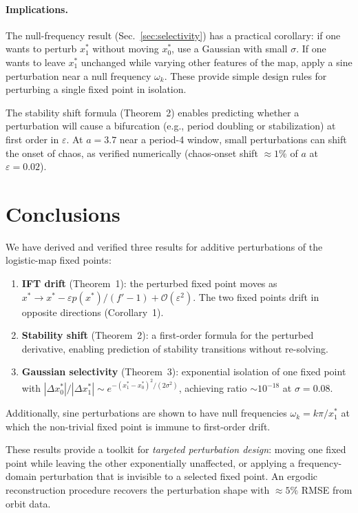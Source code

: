 \documentclass[aps,pre,twocolumn,superscriptaddress,nofootinbib,
               longbibliography,floatfix]{revtex4-2}
\newcommand{\eps}{\varepsilon}
\newcommand{\xsz}{x^*_0}
\newcommand{\xso}{x^*_1}
\newcommand{\bigO}[1]{\mathcal{O}(#1)}
\theoremstyle{plain}
\theoremstyle{remark}
\begin{document}
\paragraph{Implications.}
The null-frequency result (Sec.~\ref{sec:selectivity}) has a
practical corollary: if one wants to perturb $\xso$ without
moving $\xsz$, use a Gaussian with small $\sigma$.
If one wants to leave $\xso$ unchanged while varying other
features of the map, apply a sine perturbation near a null
frequency $\omega_k$.
These provide simple design rules for perturbing a single
fixed point in isolation.

The stability shift formula (Theorem~2) enables predicting
whether a perturbation will cause a bifurcation (e.g., period
doubling or stabilization) at first order in $\eps$.
At $a = 3.7$ near a period-4 window, small perturbations can
shift the onset of chaos, as verified numerically
(chaos-onset shift $\approx 1\%$ of $a$ at $\eps = 0.02$).

\section{Conclusions}
\label{sec:conclusions}

We have derived and verified three results for additive
perturbations of the logistic-map fixed points:
%
\begin{enumerate}
  \item \textbf{IFT drift} (Theorem~1): the perturbed fixed
    point moves as $x^* \to x^* - \eps p(x^*)/(f'-1) + \bigO{\eps^2}$.
    The two fixed points drift in opposite directions
    (Corollary~1).
  \item \textbf{Stability shift} (Theorem~2): a first-order
    formula for the perturbed derivative, enabling prediction
    of stability transitions without re-solving.
  \item \textbf{Gaussian selectivity} (Theorem~3): exponential
    isolation of one fixed point with $|\Delta x^*_0|/|\Delta x^*_1|
    \sim e^{-(\xso - \xsz)^2/(2\sigma^2)}$,
    achieving ratio $\sim 10^{-18}$ at $\sigma = 0.08$.
\end{enumerate}
%
Additionally, sine perturbations are shown to have null
frequencies $\omega_k = k\pi/\xso$ at which the non-trivial
fixed point is immune to first-order drift.

These results provide a toolkit for \emph{targeted perturbation
design}: moving one fixed point while leaving the other
exponentially unaffected, or applying a frequency-domain
perturbation that is invisible to a selected fixed point.
An ergodic reconstruction procedure recovers the perturbation
shape with $\approx 5\%$ RMSE from orbit data.
\end{document}
